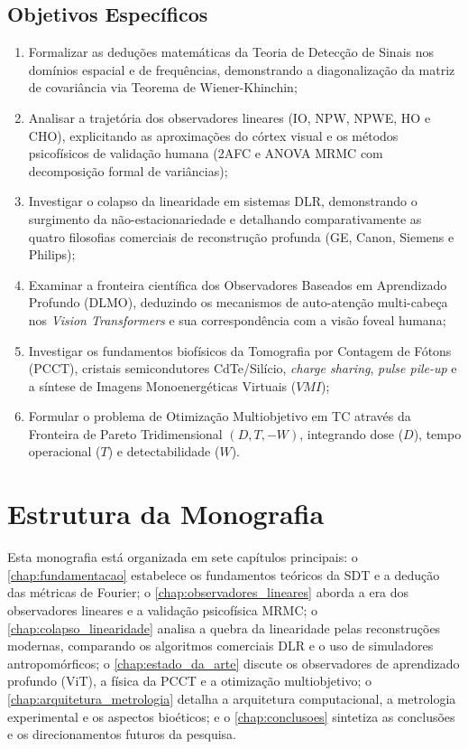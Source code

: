 \subsection{Objetivos Específicos}
\begin{enumerate}[label=\alph*)]
  \item Formalizar as deduções matemáticas da Teoria de Detecção de Sinais nos domínios espacial e de frequências, demonstrando a diagonalização da matriz de covariância via Teorema de Wiener-Khinchin;
  \item Analisar a trajetória dos observadores lineares (IO, NPW, NPWE, HO e CHO), explicitando as aproximações do córtex visual e os métodos psicofísicos de validação humana (2AFC e ANOVA MRMC com decomposição formal de variâncias);
  \item Investigar o colapso da linearidade em sistemas DLR, demonstrando o surgimento da não-estacionariedade e detalhando comparativamente as quatro filosofias comerciais de reconstrução profunda (GE, Canon, Siemens e Philips);
  \item Examinar a fronteira científica dos Observadores Baseados em Aprendizado Profundo (DLMO), deduzindo os mecanismos de auto-atenção multi-cabeça nos \emph{Vision Transformers} e sua correspondência com a visão foveal humana;
  \item Investigar os fundamentos biofísicos da Tomografia por Contagem de Fótons (PCCT), cristais semicondutores CdTe/Silício, \emph{charge sharing}, \emph{pulse pile-up} e a síntese de Imagens Monoenergéticas Virtuais ($VMI$);
  \item Formular o problema de Otimização Multiobjetivo em TC através da Fronteira de Pareto Tridimensional $(D, T, -W)$, integrando dose ($D$), tempo operacional ($T$) e detectabilidade ($W$).
\end{enumerate}

\section{Estrutura da Monografia}
\label{sec:estrutura}

Esta monografia está organizada em sete capítulos principais: o \cref{chap:fundamentacao} estabelece os fundamentos teóricos da SDT e a dedução das métricas de Fourier; o \cref{chap:observadores_lineares} aborda a era dos observadores lineares e a validação psicofísica MRMC; o \cref{chap:colapso_linearidade} analisa a quebra da linearidade pelas reconstruções modernas, comparando os algoritmos comerciais DLR e o uso de simuladores antropomórficos; o \cref{chap:estado_da_arte} discute os observadores de aprendizado profundo (ViT), a física da PCCT e a otimização multiobjetivo; o \cref{chap:arquitetura_metrologia} detalha a arquitetura computacional, a metrologia experimental e os aspectos bioéticos; e o \cref{chap:conclusoes} sintetiza as conclusões e os direcionamentos futuros da pesquisa.
